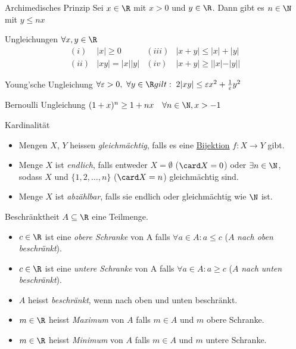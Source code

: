 
\graphicspath{ {./Images/} }
\begin{corollary}[]{Archimedisches Prinzip}
    Sei $x \in \R$ mit $x > 0$ und $y \in \R$. Dann gibt es $n \in \N$ mit $y \leq nx$
\end{corollary}
\begin{theorem}{Ungleichungen}
    $\forall x,y \in \R$
    \begin{equation*}
        \begin{array}{lclc}
            (i) & |x| \geq 0 & (iii) & |x+y| \leq |x| + |y|\\
            (ii) & |xy| = |x||y| & (iv) & |x+y| \geq ||x| - |y||
        \end{array}
    \end{equation*}
\end{theorem}
\begin{theorem}[]{Young'sche Ungleichung}
       $\forall \varepsilon > 0,~\forall y \in \R gilt:
       \hspace{1mm}
       2 |xy| \leq \varepsilon x^2 + \frac{1}{\varepsilon} y^2$
\end{theorem}
\begin{lemma}[]{Bernoulli Ungleichung}
    $(1 + x)^n \geq 1 + nx \quad \forall n \in \N, x > -1$
\end{lemma}
\begin{definition}{Kardinalität}
    \begin{itemize}
        \item Mengen $X$, $Y$ heissen \emph{gleichmächtig}, falls es eine \underline{Bijektion} $f: X \to Y$ gibt.
        \item Menge $X$ ist \emph{endlich}, falls entweder $X = \emptyset$ ($\card X = 0$) oder $\exists n \in \N$, sodass $X$ und $\{1,2,\ldots,n\}$ ($\card X = n$) gleichmächtig sind.
        \item Menge $X$ ist \emph{abzählbar}, falls sie endlich oder gleichmächtig wie $\N$ ist.
    \end{itemize}
\end{definition}
\begin{definition}{Beschränktheit}
    $A \subseteq \R$ eine Teilmenge.
    \begin{itemize}
        \item $c \in \R$ ist eine \emph{obere Schranke} von A falls $\forall a \in A: a\leq c$ ($A$ \textit{nach oben beschränkt}).
        \item $c \in \R$ ist eine \emph{untere Schranke} von A falls $\forall a \in A: a \geq c$ ($A$ \textit{nach unten beschränkt}).
        \item $A$ heisst \textit{beschränkt}, wenn nach oben und unten beschränkt.
        \item $m \in \R$ heisst \emph{Maximum} von $A$ falls $m \in A$ und $m$ obere Schranke.
        \item $m \in \R$ heisst \emph{Minimum} von $A$ falls $m \in A$ und $m$ untere Schranke.
    \end{itemize}
\end{definition}


